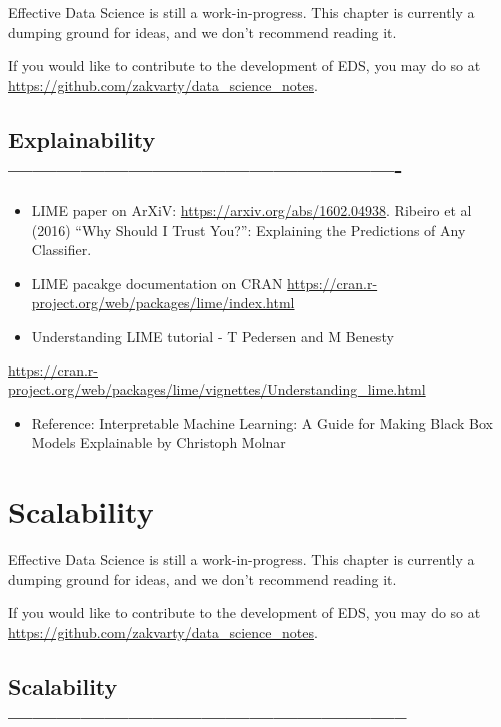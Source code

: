 \documentclass[
  12pt,
]{book}
\providecommand{\tightlist}{%
  \setlength{\itemsep}{0pt}\setlength{\parskip}{0pt}}
\begin{document}
Effective Data Science is still a work-in-progress. This chapter is currently a dumping ground for ideas, and we don't recommend reading it.

If you would like to contribute to the development of EDS, you may do so at \url{https://github.com/zakvarty/data_science_notes}.

\hypertarget{explainability--}{%
\section{Explainability -------------------------------------------------}\label{explainability--}}

\begin{itemize}
\item
  LIME paper on ArXiV: \url{https://arxiv.org/abs/1602.04938}. Ribeiro et al (2016) ``Why Should I Trust You?'': Explaining the Predictions of Any Classifier.
\item
  LIME pacakge documentation on CRAN \url{https://cran.r-project.org/web/packages/lime/index.html}
\item
  Understanding LIME tutorial - T Pedersen and M Benesty
\end{itemize}

\url{https://cran.r-project.org/web/packages/lime/vignettes/Understanding_lime.html}

\begin{itemize}
\tightlist
\item
  Reference: Interpretable Machine Learning: A Guide for Making Black Box Models Explainable by Christoph Molnar
\end{itemize}

\hypertarget{production-scalability}{%
\chapter{Scalability}\label{production-scalability}}

Effective Data Science is still a work-in-progress. This chapter is currently a dumping ground for ideas, and we don't recommend reading it.

If you would like to contribute to the development of EDS, you may do so at \url{https://github.com/zakvarty/data_science_notes}.

\hypertarget{scalability}{%
\section{Scalability --------------------------------------------------}\label{scalability}}
\end{document}
